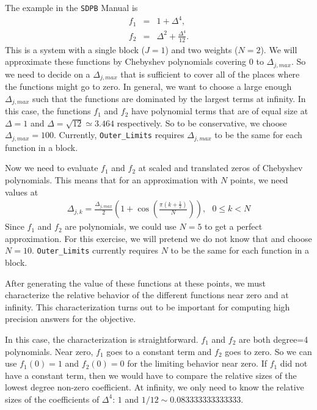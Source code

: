 \documentclass[12pt]{article}
\numberwithin{equation}{section}
\begin{document}
The example in the \texttt{SDPB} Manual is
\begin{eqnarray}
  f_1 & = & 1 + \Delta^4, \\
  f_2 & = & \Delta^2 + \frac{\Delta^4}{12}.
\end{eqnarray}
This is a system with a single block ($J=1$) and two weights ($N=2$).
We will approximate these functions by Chebyshev polynomials covering
$0$ to $\Delta_{j,max}$.  So we need to decide on a $\Delta_{j,max}$
that is sufficient to cover all of the places where the functions
might go to zero.  In general, we want to choose a large enough
$\Delta_{j,max}$ such that the functions are dominated by the largest
terms at infinity.  In this case, the functions $f_1$ and $f_2$ have
polynomial terms that are of equal size at $\Delta=1$ and
$\Delta=\sqrt{12}\simeq 3.464$ respectively.  So to be conservative,
we choose $\Delta_{j,max}=100$.  Currently, \texttt{Outer\_Limits}
requires $\Delta_{j,max}$ to be the same for each function in a block.

Now we need to evaluate $f_1$ and $f_2$ at scaled and translated zeros
of Chebyshev polynomials.  This means that for an approximation with
$N$ points, we need values at
\begin{eqnarray}
\Delta_{j,k} =  \frac{\Delta_{j,max}}{2} \left(1 + \cos\left({\frac{\pi \left( k + \frac{1}{2} \right)}{N}}\right)\right), \textrm{ } 0 \le k < N
\end{eqnarray}
Since $f_1$ and $f_2$ are polynomials, we could use $N=5$ to get a
perfect approximation.  For this exercise, we will pretend we do not
know that and choose $N=10$.  \texttt{Outer\_Limits}
currently requires $N$ to be the same for each function in a block.

After generating the value of these functions at these points, we must
characterize the relative behavior of the different functions near
zero and at infinity.  This characterization turns out to be important
for computing high precision answers for the objective.

In this case, the characterization is straightforward.  $f_1$ and
$f_2$ are both degree=4 polynomials.  Near zero, $f_1$ goes to a
constant term and $f_2$ goes to zero.  So we can use $f_{1}(0)=1$ and
$f_{2}(0)=0$ for the limiting behavior near zero.  If $f_1$ did not
have a constant term, then we would have to compare the relative sizes
of the lowest degree non-zero coefficient.  At infinity, we only need
to know the relative sizes of the coefficients of $\Delta^4$: $1$ and
$1/12 \sim 0.083333333333333$.
\end{document}
